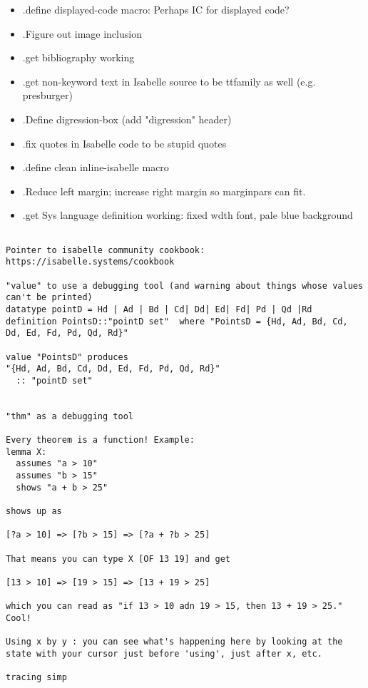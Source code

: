 \begin{itemize}
\item .define displayed-code macro: Perhaps IC for displayed code? 
\item .Figure out image inclusion
\item .get bibliography working
\item .get non-keyword text in Isabelle source to be ttfamily as well (e.g. presburger)
\item .Define digression-box (add "digression" header)
\item .fix quotes in Isabelle code to be stupid quotes
\item .define clean inline-isabelle macro 
\item .Reduce left margin; increase right margin so marginpars can fit.
\item .get Sys language definition working: fixed wdth font, pale blue background
\end{itemize}

\begin{verbatim}

Pointer to isabelle community cookbook: https://isabelle.systems/cookbook

"value" to use a debugging tool (and warning about things whose values can't be printed)
datatype pointD = Hd | Ad | Bd | Cd| Dd| Ed| Fd| Pd | Qd |Rd
definition PointsD::"pointD set"  where "PointsD = {Hd, Ad, Bd, Cd, Dd, Ed, Fd, Pd, Qd, Rd}"

value "PointsD" produces
"{Hd, Ad, Bd, Cd, Dd, Ed, Fd, Pd, Qd, Rd}"
  :: "pointD set"


"thm" as a debugging tool

Every theorem is a function! Example: 
lemma X: 
  assumes "a > 10"
  assumes "b > 15"
  shows "a + b > 25"
  
shows up as 

[?a > 10] => [?b > 15] => [?a + ?b > 25]

That means you can type X [OF 13 19] and get

[13 > 10] => [19 > 15] => [13 + 19 > 25]

which you can read as "if 13 > 10 adn 19 > 15, then 13 + 19 > 25." Cool!

Using x by y : you can see what's happening here by looking at the state with your cursor just before 'using', just after x, etc. 

tracing simp

\end{verbatim}


